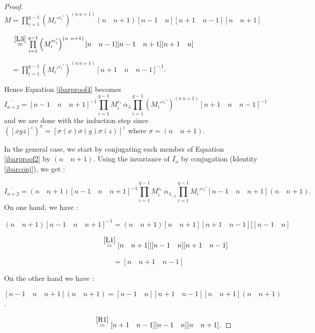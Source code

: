 \documentclass[a4paper,12pt,fleqn]{article}
\renewcommand\epsilon{\varepsilon}
\begin{document}
\begin{proof}
        $M=\prod\limits_{i=1}^{q-1}\left(M_i'^{\varepsilon_i'}\right)^{(n\ n+1)}(n\quad n+1)[n-1\quad n][n+1\quad n-1][n\quad n+1]$

        $\phantom{M}\stackrel{\ref{L3}}{=}\prod\limits_{i=1}^{q-1}\left(M_i'^{\varepsilon_i'}\right)^{(n\ n+1)}[n\quad n-1][n-1\quad n+1][n+1\quad n]$

        $\phantom{M}=\prod\limits_{i=1}^{q-1}\left(M_i'^{\varepsilon_i'}\right)^{(n\ n+1)}[n+1\quad n\quad n-1]^{-1}$.

        Hence Equation \eqref{ibarproof4} becomes
        \begin{equation*}
    \overline{I_{n+2}}=[n-1\quad n\quad n+1]^{-1}\prod\limits_{i=1}^{q-1}M_i^{\varepsilon_i}\ \alpha_{\lambda}\prod\limits_{i=1}^{q-1}\left(M_i'^{\varepsilon_i'}\right)^{(n\ n+1)}[n+1\quad n\quad n-1]^{-1}
  \end{equation*}
    and we are done with the induction step since $([xyz]^{\epsilon})^{\sigma}=[\sigma(x)\sigma(y)\sigma(z)]^{\epsilon}$ where $\sigma=(n\quad n+1)$.

        
    In the general case, we start by conjugating each member of Equation \eqref{ibarproof2} by $(n\quad n+1)$. Using the invariance of $\overline{I_n}$ by conjugation (Identity \eqref{ibarconj}), we get :


                
        \begin{equation}\label{ibarproof5}
\overline{I_{n+2}}=(n\quad n+1)[n-1\quad n\quad n+1]^{-1}\prod\limits_{i=1}^{q-1}M_i^{\varepsilon_i}\ \alpha_{\lambda_{-2}}
    \prod\limits_{i=1}^{q-1}M_i'^{\varepsilon_i'}[n-1\quad n\quad n+1](n\quad n+1).
    \end{equation}
    On one hand, we have :
    
    $(n\quad n+1)[n-1\quad n\quad n+1]^{-1}=(n\quad n+1)[n\quad n+1][n+1\quad n-1][[n-1\quad n]$
    
    $\phantom{(n\quad n+1)[n-1\quad n\quad n+1]^{-1}}\stackrel{\ref{L1}}{=}[n\quad n+1][[n-1\quad n][n+1\quad n-1]$

    $\phantom{(n\quad n+1)[n-1\quad n\quad n+1]^{-1}}=[n\quad n+1\quad n-1]$

    On the other hand we have :
    
    $[n-1\quad n\quad n+1](n\quad n+1)=[n-1\quad n][n+1\quad n-1][n\quad n+1](n\quad n+1)$.

    $\phantom{[n-1\quad n\quad n+1](n\quad n+1)}\stackrel{\ref{R1}}{=}[n+1\quad n-1][n-1\quad n][n\quad n+1]$.


\end{proof}
\end{document}
